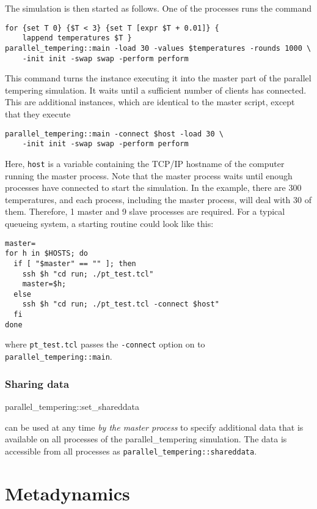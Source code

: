 The simulation is then started as follows. One of the processes runs the command
\begin{verbatim}
for {set T 0} {$T < 3} {set T [expr $T + 0.01]} {
    lappend temperatures $T }
parallel_tempering::main -load 30 -values $temperatures -rounds 1000 \
    -init init -swap swap -perform perform
\end{verbatim}
This command turns the \es instance executing it into the master part of the parallel tempering
simulation. It waits until a sufficient number of clients has connected. This are additional \es{}
instances, which are identical to the master script, except that they execute
\begin{verbatim}
parallel_tempering::main -connect $host -load 30 \
    -init init -swap swap -perform perform
\end{verbatim}
Here, {\tt host} is a variable containing the TCP/IP hostname of the computer running the master
process. Note that the master process waits until enough processes have connected to start the
simulation. In the example, there are 300 temperatures, and each process, including the master
process, will deal with 30 of them. Therefore, 1 master and 9 slave processes are required. For a
typical queueing system, a starting routine could look like this:
\begin{verbatim}
master=
for h in $HOSTS; do
  if [ "$master" == "" ]; then
    ssh $h "cd run; ./pt_test.tcl"
    master=$h;
  else
    ssh $h "cd run; ./pt_test.tcl -connect $host"
  fi
done
\end{verbatim}
where {\tt pt_test.tcl} passes the {\tt -connect} option on to {\tt parallel_tempering::main}.

\subsubsection{Sharing data}

\begin{essyntax}
  parallel_tempering::set_shareddata 
\end{essyntax}

can be used at any time {\em by the master process} to specify additional data that is available on
all processes of the parallel_tempering simulation. The data is accessible from all processes as
{\tt parallel_tempering::shareddata}.

\section{Metadynamics}

